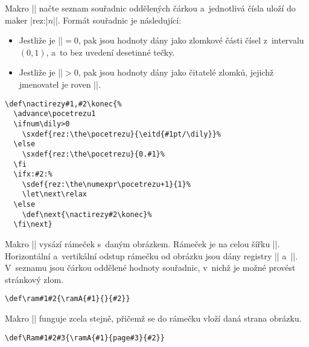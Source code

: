 \documentclass{csbulletin}
\begin{document}
Makro |\nactirezy| načte seznam souřadnic oddělených čárkou a~jednotlivá čísla uloží do maker |\csname rez:|$n$|\endcsname|. Formát souřadnic je následující:
\begin{itemize}
\item Jestliže je |\dily|${}=0$, pak jsou hodnoty dány jako zlomkové části čísel z~intervalu~$(0,1)$, a~to bez uvedení desetinné tečky.
\item Jestliže je |\dily|${}>0$, pak jsou hodnoty dány jako čitatelé zlomků, jejichž jmenovatel je roven |\dily|.
\end{itemize}


\begin{Verbatim}
\def\nactirezy#1,#2\konec{%
  \advance\pocetrezu1
  \ifnum\dily>0
    \sxdef{rez:\the\pocetrezu}{\eitd{#1pt/\dily}}%
  \else
    \sxdef{rez:\the\pocetrezu}{0.#1}%
  \fi
  \ifx:#2:%
    \sdef{rez:\the\numexpr\pocetrezu+1}{1}%
    \let\next\relax
  \else
    \def\next{\nactirezy#2\konec}%
  \fi\next}
\end{Verbatim}

Makro || vysází rámeček s~daným obrázkem. Rámeček je na celou šířku |\hsize|. Horizontální a~vertikální odstup rámečku od obrázku jsou dány registry |\hodstup| a~|\vodstup|. V~seznamu jsou čárkou oddělené hodnoty souřadnic, v~nichž je možné provést stránkový zlom.
\begin{Verbatim}
\def\ram#1#2{\ramA{#1}{}{#2}}
\end{Verbatim}
Makro || funguje zcela stejně, přičemž se do rámečku vloží daná strana obrázku.
\begin{Verbatim}
\def\Ram#1#2#3{\ramA{#1}{page#3}{#2}}
\end{Verbatim}
\end{document}
